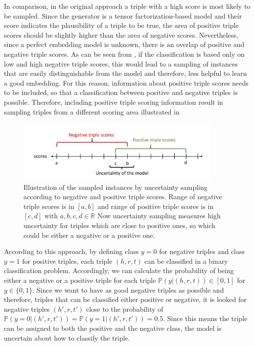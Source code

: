 In comparison, in the original \kbgan approach a triple with a high score is most likely to be sampled.
Since the generator is a tensor factorization-based model and their score indicates the plausibility of a triple to be true, the area of positive triple scores should be slightly higher than the area of negative scores.
Nevertheless, since a perfect embedding model is unknown, there is an overlap of positive and negative triple scores.
As can be seen from , if the classification is based only on low and high negative triple scores, this would lead to a sampling of instances that are easily distinguishable from the model and therefore, less helpful to learn a good embedding.
For this reason, information about positive triple scores needs to be included, so that a classification between positive and negative triples is possible.
Therefore, including positive triple scoring information result in sampling triples from a different scoring area illustrated in 
\begin{figure}[H]
  \centering
    \includegraphics[width=0.9\textwidth]{figures/positiveVsNegativeApproach.pdf}
  \caption{Illustration of the sampled instances by uncertainty sampling according to negative and positive triple scores.
  Range of negative triple scores is in $[a, b]$ and range of positive triple scores is in  $[c, d]$ with $a,b,c,d \in \mathbb{R}$
  Now uncertainty sampling measures high uncertainty for triples which are close to positive ones, so which could be either a negative or a positive one.}
  \label{fig:positiveVsNegativeApproach}
\end{figure}
According to this approach, by defining class $y = 0$ for negative triples and class $y = 1$ for positive triples, each triple $(h,r,t)$ can be classified in a binary classification problem.
Accordingly, we can calculate the probability of being either a negative or a positive triple for each triple $\mathbb{P}(y| (h,r,t)) \in [0,1]$ for $y \in \{0,1\}$.
Since we want to have as good negative triples as possible and therefore, triples that can be classified either positive or negative, it is looked for negative triples $(h',r,t')$ close to the probability of $\mathbb{P}(y = 0| (h',r,t')) = \mathbb{P}(y = 1| (h',r,t')) = 0.5$.
Since this means the triple can be assigned to both the positive and the negative class, the model is uncertain about how to classify the triple.
\clearpage